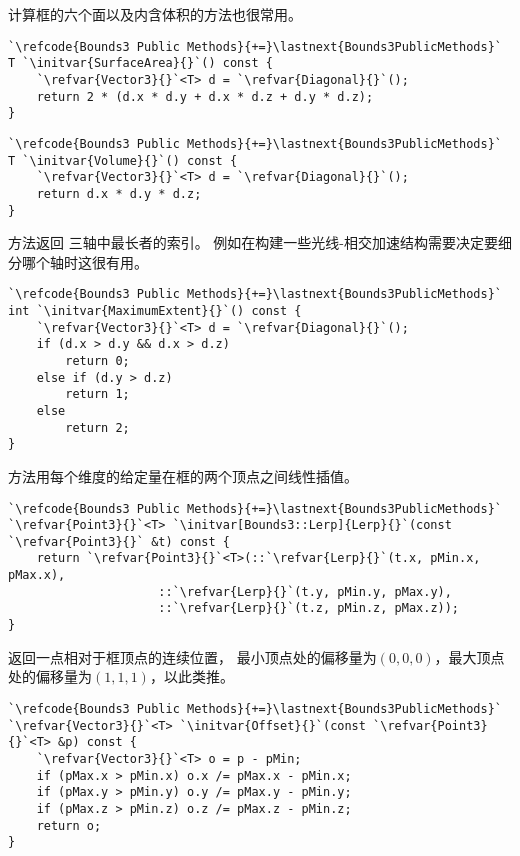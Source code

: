 计算框的六个面以及内含体积的方法也很常用。
\begin{lstlisting}
`\refcode{Bounds3 Public Methods}{+=}\lastnext{Bounds3PublicMethods}`
T `\initvar{SurfaceArea}{}`() const {
    `\refvar{Vector3}{}`<T> d = `\refvar{Diagonal}{}`();
    return 2 * (d.x * d.y + d.x * d.z + d.y * d.z);
}
\end{lstlisting}

\begin{lstlisting}
`\refcode{Bounds3 Public Methods}{+=}\lastnext{Bounds3PublicMethods}`
T `\initvar{Volume}{}`() const {
    `\refvar{Vector3}{}`<T> d = `\refvar{Diagonal}{}`();
    return d.x * d.y * d.z;
}
\end{lstlisting}

方法返回
三轴中最长者的索引。
例如在构建一些光线-相交加速结构需要决定要细分哪个轴时这很有用。
\begin{lstlisting}
`\refcode{Bounds3 Public Methods}{+=}\lastnext{Bounds3PublicMethods}`
int `\initvar{MaximumExtent}{}`() const {
    `\refvar{Vector3}{}`<T> d = `\refvar{Diagonal}{}`();
    if (d.x > d.y && d.x > d.z)
        return 0;
    else if (d.y > d.z)
        return 1;
    else
        return 2;
}
\end{lstlisting}

方法用每个维度的给定量在框的两个顶点之间线性插值。
\begin{lstlisting}
`\refcode{Bounds3 Public Methods}{+=}\lastnext{Bounds3PublicMethods}`
`\refvar{Point3}{}`<T> `\initvar[Bounds3::Lerp]{Lerp}{}`(const `\refvar{Point3}{}` &t) const {
    return `\refvar{Point3}{}`<T>(::`\refvar{Lerp}{}`(t.x, pMin.x, pMax.x),
                     ::`\refvar{Lerp}{}`(t.y, pMin.y, pMax.y),
                     ::`\refvar{Lerp}{}`(t.z, pMin.z, pMax.z));
}
\end{lstlisting}

返回一点相对于框顶点的连续位置，
最小顶点处的偏移量为$(0,0,0)$，最大顶点处的偏移量为$(1,1,1)$，以此类推。
\begin{lstlisting}
`\refcode{Bounds3 Public Methods}{+=}\lastnext{Bounds3PublicMethods}`
`\refvar{Vector3}{}`<T> `\initvar{Offset}{}`(const `\refvar{Point3}{}`<T> &p) const {
    `\refvar{Vector3}{}`<T> o = p - pMin;
    if (pMax.x > pMin.x) o.x /= pMax.x - pMin.x;
    if (pMax.y > pMin.y) o.y /= pMax.y - pMin.y;
    if (pMax.z > pMin.z) o.z /= pMax.z - pMin.z;
    return o;
}
\end{lstlisting}

